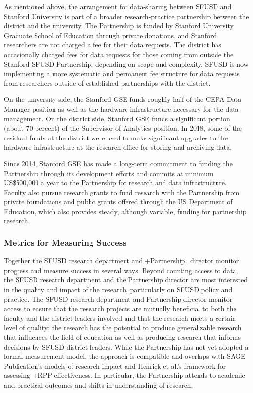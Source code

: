 \documentclass[
]{WileySix}
\begin{document}
As mentioned above, the arrangement for data-sharing between SFUSD and Stanford University is part of a broader research-practice partnership between the district and the university. The Partnership is funded by Stanford University Graduate School of Education through private donations, and Stanford researchers are not charged a fee for their data requests. The district has occasionally charged fees for data requests for those coming from outside the Stanford-SFUSD Partnership, depending on scope and complexity. SFUSD is now implementing a more systematic and permanent fee structure for data requests from researchers outside of established partnerships with the district.

On the university side, the Stanford GSE funds roughly half of the CEPA Data Manager position as well as the hardware infrastructure necessary for the data management. On the district side, Stanford GSE funds a significant portion (about 70 percent) of the Supervisor of Analytics position. In 2018, some of the residual funds at the district were used to make significant upgrades to the hardware infrastructure at the research office for storing and archiving data.

Since 2014, Stanford GSE has made a long-term commitment to funding the Partnership through its development efforts and commits at minimum US\$500,000 a year to the Partnership for research and data infrastructure. Faculty also pursue research grants to fund research with the Partnership from private foundations and public grants offered through the US Department of Education, which also provides steady, although variable, funding for partnership research.

\hypertarget{metrics-for-measuring-success}{%
\subsubsection{Metrics for Measuring Success}\label{metrics-for-measuring-success}}

Together the SFUSD research department and +Partnership\_director\textbar{} monitor progress and measure success in several ways. Beyond counting access to data, the SFUSD research department and the Partnership director are most interested in the quality and impact of the research, particularly on SFUSD policy and practice. The SFUSD research department and Partnership director monitor access to ensure that the research projects are mutually beneficial to both the faculty and the district leaders involved and that the research meets a certain level of quality; the research has the potential to produce generalizable research that influences the field of education as well as producing research that informs decisions by SFUSD district leaders. While the Partnership has not yet adopted a formal measurement model, the approach is compatible and overlaps with SAGE Publication's \citeyearpar{sagepublishing2019} models of research impact and Henrick et al.'s \citeyearpar{henrick2017} framework for assessing +RPP\textbar{} effectiveness. In particular, the Partnership attends to academic and practical outcomes and shifts in understanding of research.
\end{document}
